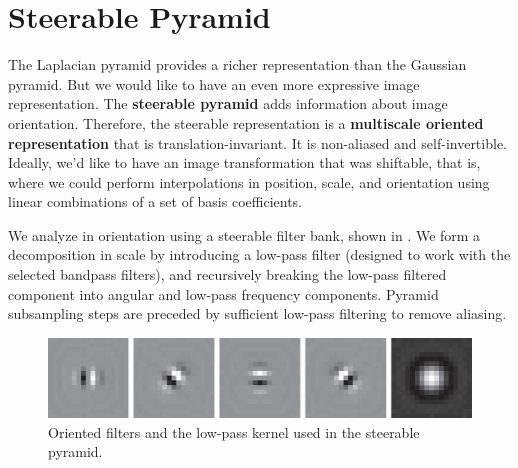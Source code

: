%
%
%
%
%
%
%
\section{Steerable Pyramid}

The Laplacian pyramid provides a richer representation than the Gaussian pyramid. But we would like to have an even more expressive image representation.  The {\bf steerable pyramid} \cite{Simoncelli95} adds information about image orientation. Therefore, the steerable representation is a {\bf multiscale oriented representation} that is translation-invariant. 
It is non-aliased and self-invertible. Ideally, we'd like to have an image transformation that was
shiftable, that is, where we could perform interpolations in position, scale,
and orientation using linear combinations of a set of basis
coefficients.  %


We analyze in orientation using a steerable filter bank, shown in \fig{\ref{fig:steerable_pyr_sp3Filters}}.  We form a
decomposition in scale by introducing a low-pass filter (designed to
work with the selected bandpass filters), and recursively breaking the
low-pass filtered component into angular and low-pass frequency
components.   Pyramid subsampling steps are preceded by sufficient
low-pass filtering to remove aliasing.


\begin{figure}[h!]
\centerline{
\includegraphics[width=0.80\linewidth]{figures/pyramids/steerable_pyr_sp3Filters.eps}
}
\caption{Oriented filters and the low-pass kernel used in the steerable pyramid.}
\label{fig:steerable_pyr_sp3Filters}
\end{figure}

